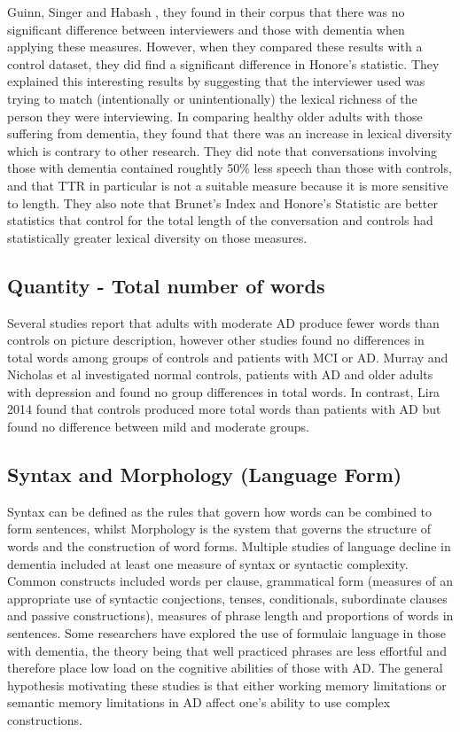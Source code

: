Guinn, Singer and Habash \cite{Guinn2015}, they found in their corpus that there was no significant difference between interviewers and those with dementia when applying these measures. However, when they compared these results with a control dataset, they did find a significant difference in Honore's statistic. They explained this interesting results by suggesting that the interviewer used was trying to match (intentionally or unintentionally) the lexical richness of the person they were interviewing. In comparing healthy older adults with those suffering from dementia, they found that there was an increase in lexical diversity which is contrary to other research. They did note that conversations involving those with dementia contained roughtly 50\% less speech than those with controls, and that TTR in particular is not a suitable measure because it is more sensitive to length. They also note that Brunet's Index and Honore's Statistic are better statistics that control for the total length of the conversation and controls had statistically greater lexical diversity on those measures. 


\subsection{Quantity - Total number of words}
Several studies report that adults with moderate AD produce fewer words than controls on picture description, however other studies found no differences in total words among groups of controls and patients with MCI or AD. Murray and Nicholas et al investigated normal controls, patients with AD and older adults with depression and found no group differences in total words. In contrast, Lira 2014 found that controls produced more total words than patients with AD but found no difference between mild and moderate groups. \newline
\par
\subsection{Syntax and Morphology (Language Form)}
Syntax can be defined as the rules that govern how words can be combined to form sentences, whilst Morphology is the system that governs the structure of words and the construction of word forms. Multiple studies of language decline in dementia included at least one measure of syntax or syntactic complexity. Common constructs included words per clause, grammatical form (measures of an appropriate use of syntactic conjections, tenses, conditionals, subordinate clauses and passive constructions), measures of phrase length and proportions of words in sentences. Some researchers have explored the use of formulaic language in those with dementia, the theory being that well practiced phrases are less effortful and therefore place low load on the cognitive abilities of those with AD. The general hypothesis motivating these studies is that either working memory limitations or semantic memory limitations in AD affect one's ability to use complex constructions.
\par
